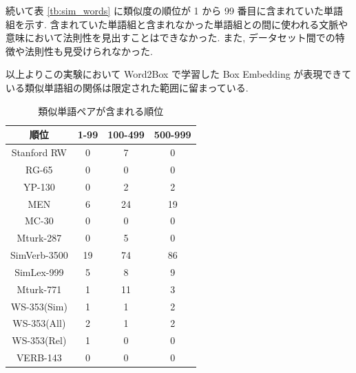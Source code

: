 \documentclass[twocolumn]{jarticle}     %
\begin{document}
続いて表 \ref{tb:sim_words} に類似度の順位が 1 から 99 番目に含まれていた単語組を示す. 
含まれていた単語組と含まれなかった単語組との間に使われる文脈や意味において法則性を見出すことはできなかった. 
また, データセット間での特徴や法則性も見受けられなかった. 

以上よりこの実験において Word2Box で学習した Box Embedding が表現できている類似単語組の関係は限定された範囲に留まっている. 

\begin{table}[th]
  \caption{類似単語ペアが含まれる順位}
  \label{tb:result}
  \begin{tabular}{c|ccc}
    \hline
    順位           & 1-99 & 100-499 & 500-999 \\ \hline \hline
    Stanford RW  & 0    & 7       & 0       \\
    RG-65        & 0    & 0       & 0       \\
    YP-130       & 0    & 2       & 2       \\
    MEN          & 6    & 24      & 19      \\
    MC-30        & 0    & 0       & 0       \\
    Mturk-287    & 0    & 5       & 0       \\
    SimVerb-3500 & 19   & 74      & 86      \\
    SimLex-999   & 5    & 8       & 9       \\
    Mturk-771    & 1    & 11      & 3       \\
    WS-353(Sim)  & 1    & 1       & 2       \\
    WS-353(All)  & 2    & 1       & 2       \\
    WS-353(Rel)  & 1    & 0       & 0       \\
    VERB-143     & 0    & 0       & 0       \\ \hline
  \end{tabular}
\end{table}
\end{document}
